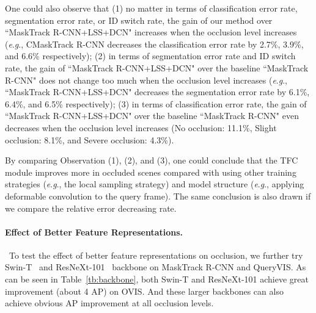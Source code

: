 \documentclass[twocolumn]{svjour3}          \smartqed  \usepackage{graphicx}
\newcommand{\eg}{\textit{e}.\textit{g}.}
\def\myTextColor{\textcolor[rgb]{0, 0, 0}}
\begin{document}
\begin{sloppypar}
\myTextColor{One could also observe that (1) no matter in terms of classification error rate, segmentation error rate, or ID switch rate, the gain of our method over ``MaskTrack R-CNN+LSS+DCN" increases when the occlusion level increases (\eg, CMaskTrack R-CNN decreases the classification error rate by 2.7\%, 3.9\%, and 6.6\% respectively); (2) in terms of segmentation error rate and ID switch rate, the gain of ``MaskTrack R-CNN+LSS+DCN" over the baseline ``MaskTrack R-CNN" does not change too much when the occlusion level increases (\eg, ``MaskTrack R-CNN+LSS+DCN" decreases the segmentation error rate by 6.1\%, 6.4\%, and 6.5\% respectively); (3) in terms of classification error rate, the gain of ``MaskTrack R-CNN+LSS+DCN" over the baseline ``MaskTrack R-CNN" even decreases when the occlusion level increases (No occlusion: 11.1\%, Slight occlusion: 8.1\%, and Severe occlusion: 4.3\%).}

\myTextColor{By comparing Observation (1), (2), and (3), one could conclude that the TFC module improves more in occluded scenes compared with using other training strategies (\eg, the local sampling strategy) and model structure (\eg, applying deformable convolution to the query frame). The same conclusion is also drawn if we compare the relative error decreasing rate.}


\paragraph{\myTextColor{Effect of Better Feature Representations.}}~\myTextColor{To test the effect of better feature representations on occlusion, we further try Swin-T~\cite{swin} and ResNeXt-101~\cite{resnext} backbone on MaskTrack R-CNN and QueryVIS. As can be seen in Table~\ref{tb:backbone}, both Swin-T and ResNeXt-101 achieve great improvement (about 4 AP) on OVIS. And these larger backbones can also achieve obvious AP improvement at all occlusion levels.}


\end{sloppypar}
\end{document}
